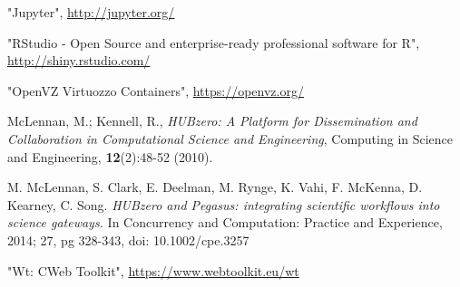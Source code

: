 \documentclass[conference]{../sty/IEEEtran}
\newcommand\CC{C\nolinebreak[4]\hspace{-.05em}\raisebox{.4ex}{\relsize{-3}{\textbf{++}}}\hspace{.25em}}
\begin{document}
\begin{thebibliography}{1}

"Jupyter", \url{http://jupyter.org/}

"RStudio - Open Source and enterprise-ready professional software for R", \url{http://shiny.rstudio.com/}

"OpenVZ Virtuozzo Containers", \url{https://openvz.org/}

McLennan, M.; Kennell, R., \emph{HUBzero: A Platform for Dissemination
and Collaboration in Computational Science and Engineering}, Computing
in Science and Engineering, \textbf{12}(2):48-52 (2010).

M. McLennan, S. Clark, E. Deelman, M. Rynge, K. Vahi, F.
McKenna, D. Kearney, C. Song. \emph{HUBzero and Pegasus:
integrating scientific workflows into science gateways.} In
Concurrency and Computation: Practice and Experience,
2014; 27, pg 328-343, doi: 10.1002/cpe.3257

"Wt: \CC Web Toolkit", \url{https://www.webtoolkit.eu/wt}

\end{thebibliography}
\end{document}
